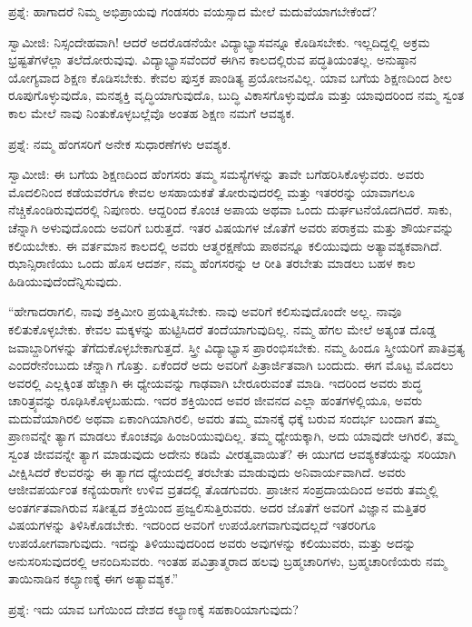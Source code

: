 ಪ್ರಶ್ನೆ: ಹಾಗಾದರೆ ನಿಮ್ಮ ಅಭಿಪ್ರಾಯವು ಗಂಡಸರು ವಯಸ್ಸಾದ ಮೇಲೆ ಮದುವೆಯಾಗಬೇಕೆಂದೆ?

ಸ್ವಾಮೀಜಿ: ನಿಸ್ಸಂದೇಹವಾಗಿ! ಆದರೆ ಅದರೊಡನೆಯೇ ವಿದ್ಯಾಭ್ಯಾಸವನ್ನೂ ಕೊಡಿಸಬೇಕು. ಇಲ್ಲದಿದ್ದಲ್ಲಿ ಅಕ್ರಮ ಭ್ರಷ್ಟತೆಗಳೆಲ್ಲಾ ತಲೆದೋರುವುವು. ವಿದ್ಯಾಭ್ಯಾಸವೆಂದರೆ ಈಗಿನ ಕಾಲದಲ್ಲಿರುವ ಪದ್ಧತಿಯಂತಲ್ಲ. ಅನುಷ್ಠಾನ ಯೋಗ್ಯವಾದ ಶಿಕ್ಷಣ ಕೊಡಿಸಬೇಕು. ಕೇವಲ ಪುಸ್ತಕ ಪಾಂಡಿತ್ಯ ಪ್ರಯೋಜನವಿಲ್ಲ. ಯಾವ ಬಗೆಯ ಶಿಕ್ಷಣದಿಂದ ಶೀಲ ರೂಪುಗೊಳ್ಳುವುದೊ, ಮನಶ್ಶಕ್ತಿ ವೃದ್ಧಿಯಾಗುವುದೊ, ಬುದ್ಧಿ ವಿಕಾಸಗೊಳ್ಳುವುದೊ ಮತ್ತು ಯಾವುದರಿಂದ ನಮ್ಮ ಸ್ವಂತ ಕಾಲ ಮೇಲೆ ನಾವು ನಿಂತುಕೊಳ್ಳಬಲ್ಲೆವೊ ಅಂತಹ ಶಿಕ್ಷಣ ನಮಗೆ ಆವಶ್ಯಕ.

ಪ್ರಶ್ನೆ: ನಮ್ಮ ಹೆಂಗಸರಿಗೆ ಅನೇಕ ಸುಧಾರಣೆಗಳು ಆವಶ್ಯಕ.

ಸ್ವಾಮೀಜಿ: ಈ ಬಗೆಯ ಶಿಕ್ಷಣದಿಂದ ಹೆಂಗಸರು ತಮ್ಮ ಸಮಸ್ಯೆಗಳನ್ನು ತಾವೇ ಬಗೆಹರಿಸಿಕೊಳ್ಳುವರು. ಅವರು ಮೊದಲಿನಿಂದ ಕಡೆಯವರೆಗೂ ಕೇವಲ ಅಸಹಾಯಕತೆ ತೋರುವುದರಲ್ಲಿ ಮತ್ತು ಇತರರನ್ನು ಯಾವಾಗಲೂ ನೆಚ್ಚಿಕೊಂಡಿರುವುದರಲ್ಲಿ ನಿಪುಣರು. ಆದ್ದರಿಂದ ಕೊಂಚ ಅಪಾಯ ಅಥವಾ ಒಂದು ದುರ್ಘಟನೆಯೊದಗಿದರೆ. ಸಾಕು, ಚೆನ್ನಾಗಿ ಅಳುವುದೊಂದು ಅವರಿಗೆ ಬರುತ್ತದೆ. ಇತರ ವಿಷಯಗಳ ಜೊತೆಗೆ ಅವರು ಪರಾಕ್ರಮ ಮತ್ತು ಶೌರ್ಯವನ್ನು ಕಲಿಯಬೇಕು. ಈ ವರ್ತಮಾನ ಕಾಲದಲ್ಲಿ ಅವರು ಆತ್ಮರಕ್ಷಣೆಯ ಪಾಠವನ್ನೂ ಕಲಿಯುವುದು ಅತ್ಯಾವಶ್ಯಕವಾಗಿದೆ. ಝಾನ್ಸಿರಾಣಿಯು ಒಂದು ಹೊಸ ಆದರ್ಶ, ನಮ್ಮ ಹೆಂಗಸರನ್ನು ಆ ರೀತಿ ತರಬೇತು ಮಾಡಲು ಬಹಳ ಕಾಲ ಹಿಡಿಯುವುದೆಂದೆನ್ನಿಸುವುದು.

“ಹೇಗಾದರಾಗಲಿ, ನಾವು ಶಕ್ತಿಮೀರಿ ಪ್ರಯತ್ನಿಸಬೇಕು. ನಾವು ಅವರಿಗೆ ಕಲಿಸುವುದೊಂದೇ ಅಲ್ಲ. ನಾವೂ ಕಲಿತುಕೊಳ್ಳಬೇಕು. ಕೇವಲ ಮಕ್ಕಳನ್ನು ಹುಟ್ಟಿಸಿದರೆ ತಂದೆಯಾಗುವುದಿಲ್ಲ. ನಮ್ಮ ಹೆಗಲ ಮೇಲೆ ಅತ್ಯಂತ ದೊಡ್ಡ ಜವಾಬ್ದಾರಿಗಳನ್ನು ತೆಗೆದುಕೊಳ್ಳಬೇಕಾಗುತ್ತದೆ. ಸ್ತ್ರೀ ವಿದ್ಯಾಭ್ಯಾಸ ಪ್ರಾರಂಭಿಸಬೇಕು. ನಮ್ಮ ಹಿಂದೂ ಸ್ತ್ರೀಯರಿಗೆ ಪಾತಿವ್ರತ್ಯ ಎಂದರೇನೆಂಬುದು ಚೆನ್ನಾಗಿ ಗೊತ್ತು. ಏಕೆಂದರೆ ಅದು ಅವರಿಗೆ ಪಿತ್ರಾರ್ಜಿತವಾಗಿ ಬಂದುದು. ಈಗ ಮೊಟ್ಟ ಮೊದಲು ಅವರಲ್ಲಿ ಎಲ್ಲಕ್ಕಿಂತ ಹೆಚ್ಚಾಗಿ ಈ ಧ್ಯೇಯವನ್ನು ಗಾಢವಾಗಿ ಬೇರೂರುವಂತೆ ಮಾಡಿ. ಇದರಿಂದ ಅವರು ಶುದ್ಧ ಚಾರಿತ್ರ್ಯವನ್ನು ರೂಢಿಸಿಕೊಳ್ಳಬಹುದು. ಇದರ ಶಕ್ತಿಯಿಂದ ಅವರ ಜೀವನದ ಎಲ್ಲಾ ಹಂತಗಳಲ್ಲಿಯೂ, ಅವರು ಮದುವೆಯಾಗಿರಲಿ ಅಥವಾ ಏಕಾಂಗಿಯಾಗಿರಲಿ, ಅವರು ತಮ್ಮ ಮಾನಕ್ಕೆ ಧಕ್ಕೆ ಬರುವ ಸಂದರ್ಭ ಬಂದಾಗ ತಮ್ಮ ಪ್ರಾಣವನ್ನೇ ತ್ಯಾಗ ಮಾಡಲು ಕೊಂಚವೂ ಹಿಂಜರಿಯುವುದಿಲ್ಲ. ತಮ್ಮ ಧ್ಯೇಯಕ್ಕಾಗಿ, ಅದು ಯಾವುದೇ ಆಗಿರಲಿ, ತಮ್ಮ ಸ್ವಂತ ಜೀವವನ್ನೇ ತ್ಯಾಗ ಮಾಡುವುದು ಅದೇನು ಕಡಿಮೆ ವೀರತ್ವವಾಯಿತೆ? ಈ ಯುಗದ ಆವಶ್ಯಕತೆಯನ್ನು ಸರಿಯಾಗಿ ವೀಕ್ಷಿಸಿದರೆ ಕೆಲವರನ್ನು ಈ ತ್ಯಾಗದ ಧ್ಯೇಯದಲ್ಲಿ ತರಬೇತು ಮಾಡುವುದು ಅನಿವಾರ್ಯವಾಗಿದೆ. ಅವರು ಆಜೀವಪರ್ಯಂತ ಕನ್ಯೆಯರಾಗೇ ಉಳಿವ ವ್ರತದಲ್ಲಿ ತೊಡಗುವರು. ಪ್ರಾಚೀನ ಸಂಪ್ರದಾಯದಿಂದ ಅವರು ತಮ್ಮಲ್ಲಿ ಅಂತರ್ಗತವಾಗಿರುವ ಸತೀತ್ವದ ಶಕ್ತಿಯಿಂದ ಪ್ರಜ್ವಲಿಸುತ್ತಿರುವರು. ಅದರ ಜೊತೆಗೆ ಅವರಿಗೆ ವಿಜ್ಞಾನ ಮತ್ತಿತರ ವಿಷಯಗಳನ್ನು ತಿಳಿಸಿಕೊಡಬೇಕು. ಇದರಿಂದ ಅವರಿಗೆ ಉಪಯೋಗವಾಗುವುದಲ್ಲದೆ ಇತರರಿಗೂ ಉಪಯೋಗವಾಗುವುದು. ಇದನ್ನು ತಿಳಿಯುವುದರಿಂದ ಅವರು ಅವುಗಳನ್ನು ಕಲಿಯುವರು, ಮತ್ತು ಅದನ್ನು ಅನುಸರಿಸುವುದರಲ್ಲಿ ಆನಂದಿಸುವರು. ಇಂತಹ ಪವಿತ್ರಾತ್ಮರಾದ ಹಲವು ಬ್ರಹ್ಮಚಾರಿಗಳು, ಬ್ರಹ್ಮಚಾರಿಣಿಯರು ನಮ್ಮ ತಾಯಿನಾಡಿನ ಕಲ್ಯಾಣಕ್ಕೆ ಈಗ ಅತ್ಯಾವಶ್ಯಕ.”

ಪ್ರಶ್ನೆ: ಇದು ಯಾವ ಬಗೆಯಿಂದ ದೇಶದ ಕಲ್ಯಾಣಕ್ಕೆ ಸಹಕಾರಿಯಾಗುವುದು?

